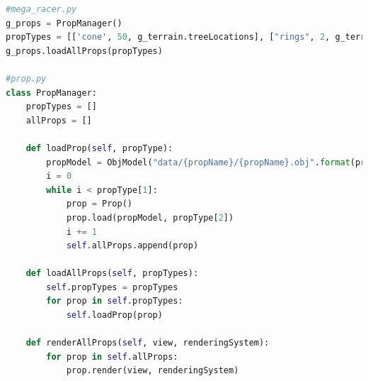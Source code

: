 \documentclass[a4 paper, 12pt]{article}
\begin{document}
\begin{lstlisting}[language=python]
#mega_racer.py
g_props = PropManager()
propTypes = [['cone', 50, g_terrain.treeLocations], ["rings", 2, g_terrain.rockLocations]]
g_props.loadAllProps(propTypes)

#prop.py
class PropManager: 
    propTypes = []
    allProps = []    

    def loadProp(self, propType):
        propModel = ObjModel("data/{propName}/{propName}.obj".format(propName=propType[0]))
        i = 0
        while i < propType[1]:
            prop = Prop()
            prop.load(propModel, propType[2])         
            i += 1
            self.allProps.append(prop)

    def loadAllProps(self, propTypes):
        self.propTypes = propTypes
        for prop in self.propTypes:
            self.loadProp(prop)

    def renderAllProps(self, view, renderingSystem):
        for prop in self.allProps:
            prop.render(view, renderingSystem)

\end{lstlisting}
\end{document}

